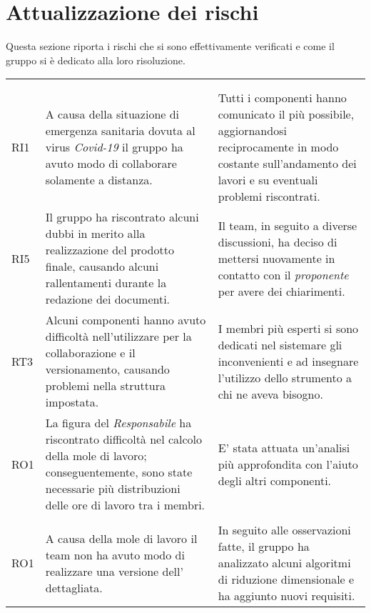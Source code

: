 \section{Attualizzazione dei rischi}

Questa sezione riporta i rischi che si sono effettivamente verificati e come il gruppo si è dedicato alla loro risoluzione.

\begin{longtable}{C{1cm} | C{8cm} | C{7cm}} 
 	 &
 	 &
 	 \\
 	
 	 \\
 	
 	RI1 & A causa della situazione di emergenza sanitaria dovuta al virus \textit{Covid-19} il gruppo ha avuto modo di collaborare solamente a distanza. & Tutti i componenti hanno comunicato il più possibile, aggiornandosi reciprocamente in modo costante sull'andamento dei lavori e su eventuali problemi riscontrati. \\
 	RI5 & Il gruppo ha riscontrato alcuni dubbi in merito alla realizzazione del prodotto finale, causando alcuni rallentamenti durante la redazione dei documenti. & Il team, in seguito a diverse discussioni, ha deciso di mettersi nuovamente in contatto con il \textit{proponente} per avere dei chiarimenti. \\
 	RT3 & Alcuni componenti hanno avuto difficoltà nell'utilizzare  per la collaborazione e il versionamento, causando problemi nella struttura impostata. & I membri più esperti si sono dedicati nel sistemare gli inconvenienti e ad insegnare l'utilizzo dello strumento a chi ne aveva bisogno. \\
 	RO1 & La figura del \textit{Responsabile} ha riscontrato difficoltà nel calcolo della mole di lavoro; conseguentemente, sono state necessarie più distribuzioni delle ore di lavoro tra i membri. & E' stata attuata un'analisi più approfondita con l'aiuto degli altri componenti. \\
 		
 	 \\
 	
 	RO1 & A causa della mole di lavoro il team non ha avuto modo di realizzare una versione dell'\AdRv{} dettagliata. &  In seguito alle osservazioni fatte, il gruppo ha analizzato alcuni algoritmi di riduzione dimensionale e ha aggiunto nuovi requisiti. \\
 	

\end{longtable}
